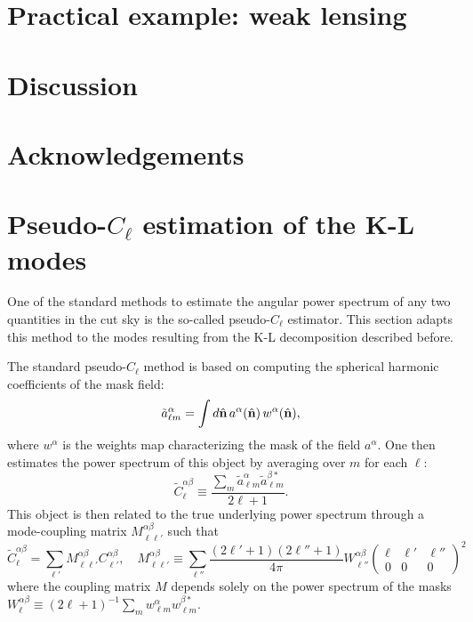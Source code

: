 \documentclass[twocolumn,amsfont,amssymb,amsmath, showpacs,balancelastpage, nofootinbib]{revtex4-1}
\newcommand{\nv}{\hat{\bf n}}
\begin{document}
\section{Practical example: weak lensing}
  \lipsum[2]

\section{Discussion}\label{sec:discussion}
  \lipsum[3]

\section*{Acknowledgements}
  \lipsum[4]
  


\appendix
\onecolumngrid
\section{Pseudo-$C_\ell$ estimation of the K-L modes}\label{app:pcl}
  One of the standard methods to estimate the angular power spectrum of any two quantities in the cut sky is the so-called pseudo-$C_\ell$ estimator. This section adapts this method to the modes resulting from the K-L decomposition described before.
  
  The standard pseudo-$C_\ell$ method is based on computing the spherical harmonic coefficients of the mask field:
  \begin{equation}
    \tilde{a}^\alpha_{\ell m}=\int d\nv\,a^\alpha(\nv)\,w^\alpha(\nv),
  \end{equation}
  where $w^\alpha$ is the weights map characterizing the mask of the field $a^\alpha$. One then estimates the power spectrum of this object by averaging over $m$ for each $\ell$:
  \begin{equation}
    \tilde{C}^{\alpha\beta}_\ell\equiv\frac{\sum_m\tilde{a}^\alpha_{\ell m}\tilde{a}^{\beta *}_{\ell m}}{2\ell+1}.
  \end{equation}
  This object is then related to the true underlying power spectrum through a mode-coupling matrix $M^{\alpha\beta}_{\ell\ell'}$ such that
  \begin{equation}
    \tilde{C}^{\alpha\beta}_\ell=\sum_{\ell'}M^{\alpha\beta}_{\ell\ell'}C^{\alpha\beta}_{\ell'},\hspace{12pt}
    M^{\alpha\beta}_{\ell \ell'}\equiv\sum_{\ell''}\frac{(2\ell'+1)(2\ell''+1)}{4\pi}W^{\alpha\beta}_{\ell''}
    \left(
    \begin{array}{ccc}
      \ell & \ell' & \ell''\\
      0 & 0 & 0
    \end{array}
    \right)^2
  \end{equation}
  where the coupling matrix $M$ depends solely on the power spectrum of the masks $W^{\alpha\beta}_\ell\equiv(2\ell+1)^{-1}\sum_mw^\alpha_{\ell m}w^{\beta *}_{\ell m}$.
  
\end{document}
